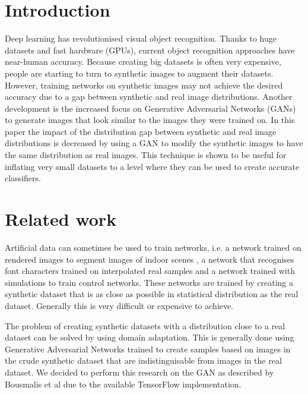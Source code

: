 \documentclass[10pt,twocolumn,letterpaper]{article}
\begin{document}
\section{Introduction}

Deep learning has revolutionised visual object recognition. Thanks to huge datasets and fast hardware (GPUs), current object recognition approaches have near-human accuracy.
Because creating big datasets is often very expensive, people are starting to turn to synthetic images to augment their datasets. However, training networks on synthetic images may not achieve the desired accuracy due to a gap between synthetic and real image distributions. \cite{10.1.1.151.7688}
Another development is the increased focus on Generative Adversarial Networks (GANs) to generate images that look similar to the images they were trained on. \cite{1406.2661}
In this paper the impact of the distribution gap between synthetic and real image distributions is decreased by using a GAN to modify the synthetic images to have the same distribution as real images. This technique is shown to be useful for inflating very small datasets to a level where they can be used to create accurate classifiers.

\section{Related work}
Artificial data can sometimes be used to train networks, i.e. a network trained on rendered images to segment images of indoor scenes \cite{10.1.1.94.777}, a network that recognises font characters trained on interpolated real samples \cite{10.1.1.151.7688} and a network trained with simulations to train control networks. \cite{10.1109/CVPR.2016.442} These networks are trained by creating a synthetic dataset that is as close as possible in statistical distribution as the real dataset. Generally this is very difficult or expensive to achieve.

The problem of creating synthetic datasets with a distribution close to a real dataset can be solved by using domain adaptation. This is generally done using Generative Adversarial Networks \cite{1703.05192.pdf, 10.1109/CVPR.2017.18, 10.1007/978-3-319-58347-1} trained to create samples based on images in the crude synthetic dataset that are indistinguisable from images in the real dataset. We decided to perform this research on the GAN as described by Bousmalis et al \cite{10.1109/CVPR.2017.18} due to the available TensorFlow \cite{tensorflow} implementation.
\end{document}
